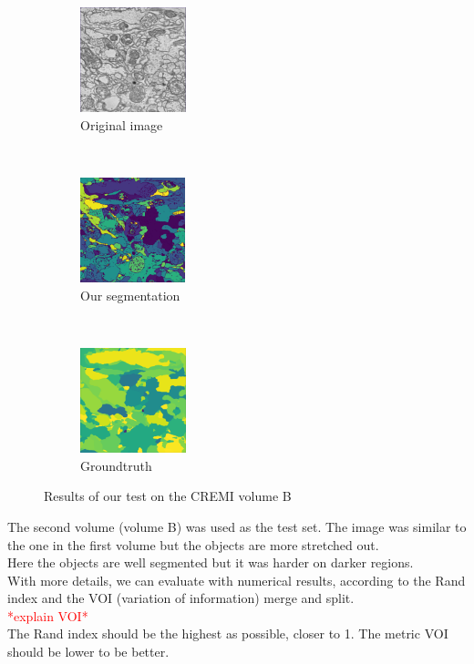 \begin{figure}[!htbp]
    \centering
    \begin{subfigure}[t]{0.31\textwidth}
        \centering
        \includegraphics[height=1.2in]{./images/cremi_orig_2.png}
        \caption{Original image}
    \end{subfigure}%
    ~ 
    \begin{subfigure}[t]{0.31\textwidth}
        \centering
        \includegraphics[height=1.2in]{./images/cremi_out_2.png}
        \caption{Our segmentation}
    \end{subfigure}
    ~ 
    \begin{subfigure}[t]{0.31\textwidth}
        \centering
        \includegraphics[height=1.2in]{./images/cremi_gt_2.png}
        \caption{Groundtruth}
    \end{subfigure}
    \caption{Results of our test on the CREMI volume B}
\end{figure}

The second volume (volume B) was used as the test set.
The image was similar to the one in the first volume but the objects are more stretched out.\\
Here the objects are well segmented but it was harder on darker regions.\\

With more details, we can evaluate with numerical results, according to the Rand index and the VOI (variation of information) merge and split.\\ 
\textcolor{red}{*explain VOI*\\}
The Rand index should be the highest as possible, closer to 1. 
The metric VOI should be lower to be better.\\

